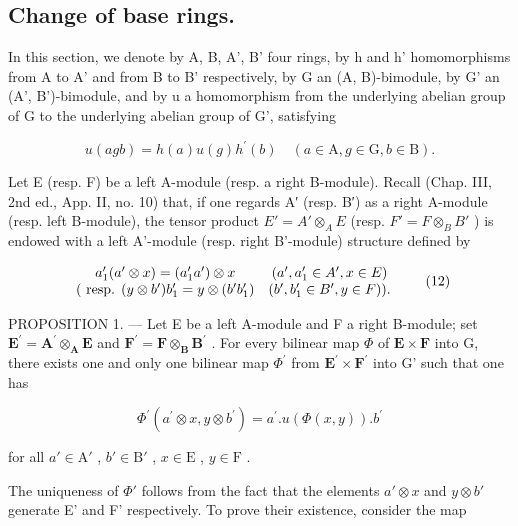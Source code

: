 \subsection{Change of base rings.}

In this section, we denote by A, B, A', B' four rings, by h and h' homomorphisms from A to A' and from B to B' respectively, by G an (A, B)-bimodule, by G' an (A', B')-bimodule, and by u a homomorphism from the underlying abelian group of G to the underlying abelian group of G', satisfying

\[
u (a g b) = h (a) u (g) h ^ {\prime} (b) \quad (a \in \mathrm{A}, g \in \mathrm{G}, b \in \mathrm{B}).\tag{11}
\]

Let E (resp. F) be a left A-module (resp. a right B-module). Recall (Chap. III, 2nd ed., App. II, no. 10) that, if one regards A′ (resp. B′) as a right A-module (resp. left B-module), the tensor product \(E' = A' \otimes_{A} E\) (resp. \(F' = F \otimes_{B} B'\) ) is endowed with a left A'-module (resp. right B'-module) structure defined by

\[
\begin{array}{c c} a _ {1} ^ {\prime} (a ^ {\prime} \otimes x) = (a _ {1} ^ {\prime} a ^ {\prime}) \otimes x & (a ^ {\prime}, a _ {1} ^ {\prime} \in A ^ {\prime}, x \in E) \\ (\text { resp. } (y \otimes b ^ {\prime}) b _ {1} ^ {\prime} = y \otimes (b ^ {\prime} b _ {1} ^ {\prime}) & (b ^ {\prime}, b _ {1} ^ {\prime} \in B ^ {\prime}, y \in F)). \end{array}\tag{12}
\]

PROPOSITION 1. --- Let E be a left A-module and F a right B-module; set \(\mathbf{E}^{\prime} = \mathbf{A}^{\prime}\otimes_{\mathbf{A}}\mathbf{E}\) and \(\mathbf{F}^{\prime} = \mathbf{F}\otimes_{\mathbf{B}}\mathbf{B}^{\prime}\) . For every bilinear map \(\Phi\) of \(\mathbf{E}\times \mathbf{F}\) into G, there exists one and only one bilinear map \(\Phi^{\prime}\) from \(\mathbf{E}^{\prime}\times \mathbf{F}^{\prime}\) into G' such that one has

\[
\Phi^ {\prime} (a ^ {\prime} \otimes x, y \otimes b ^ {\prime}) = a ^ {\prime}. u (\Phi (x, y)). b ^ {\prime}\tag{13}
\]

for all \(a' \in \mathrm{A}'\) , \(b' \in \mathrm{B}'\) , \(x \in \mathrm{E}\) , \(y \in \mathrm{F}\) .

The uniqueness of \(\Phi'\) follows from the fact that the elements \(a' \otimes x\) and \(y \otimes b'\) generate E' and F' respectively. To prove their existence, consider the map

